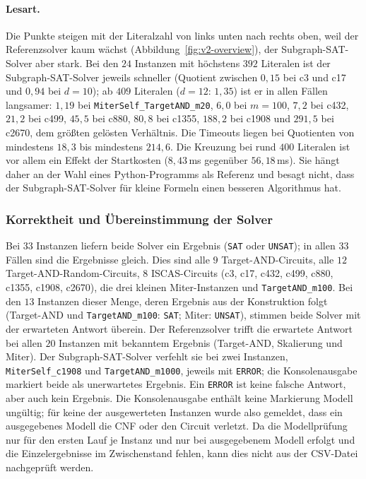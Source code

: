\documentclass[a4paper,12pt]{article}
\theoremstyle{definition}
\begin{document}
\paragraph{Lesart.} Die Punkte steigen mit der Literalzahl von links unten nach rechts oben, weil der Referenzsolver kaum wächst (Abbildung~\ref{fig:v2-overview}), der Subgraph-SAT-Solver aber stark. Bei den $24$ Instanzen mit höchstens $392$ Literalen ist der Subgraph-SAT-Solver jeweils schneller (Quotient zwischen $0{,}15$ bei c3 und c17 und $0{,}94$ bei $d=10$); ab $409$ Literalen ($d=12$: $1{,}35$) ist er in allen Fällen langsamer: $1{,}19$ bei \texttt{MiterSelf\_TargetAND\_m20}, $6{,}0$ bei $m=100$, $7{,}2$ bei c432, $21{,}2$ bei c499, $45{,}5$ bei c880, $80{,}8$ bei c1355, $188{,}2$ bei c1908 und $291{,}5$ bei c2670, dem größten gelösten Verhältnis. Die Timeouts liegen bei Quotienten von mindestens $18{,}3$ bis mindestens $214{,}6$. Die Kreuzung bei rund $400$ Literalen ist vor allem ein Effekt der Startkosten ($8{,}43$\,ms gegenüber $56{,}18$\,ms). Sie hängt daher an der Wahl eines Python-Programms als Referenz und besagt nicht, dass der Subgraph-SAT-Solver für kleine Formeln einen besseren Algorithmus hat.

\subsubsection{Korrektheit und Übereinstimmung der Solver}

Bei $33$ Instanzen liefern beide Solver ein Ergebnis (\texttt{SAT} oder \texttt{UNSAT}); in allen $33$ Fällen sind die Ergebnisse gleich. Dies sind alle $9$ Target-AND-Circuits, alle $12$ Target-AND-Random-Circuits, $8$ ISCAS-Circuits (c3, c17, c432, c499, c880, c1355, c1908, c2670), die drei kleinen Miter-Instanzen und \texttt{TargetAND\_m100}. Bei den $13$ Instanzen dieser Menge, deren Ergebnis aus der Konstruktion folgt (Target-AND und \texttt{TargetAND\_m100}: \texttt{SAT}; Miter: \texttt{UNSAT}), stimmen beide Solver mit der erwarteten Antwort überein. Der Referenzsolver trifft die erwartete Antwort bei allen $20$ Instanzen mit bekanntem Ergebnis (Target-AND, Skalierung und Miter). Der Subgraph-SAT-Solver verfehlt sie bei zwei Instanzen, \texttt{MiterSelf\_c1908} und \texttt{TargetAND\_m1000}, jeweils mit \texttt{ERROR}; die Konsolenausgabe markiert beide als \glqq unerwartetes Ergebnis\grqq. Ein \texttt{ERROR} ist keine falsche Antwort, aber auch kein Ergebnis. Die Konsolenausgabe enthält keine Markierung \glqq Modell ungültig\grqq; für keine der ausgewerteten Instanzen wurde also gemeldet, dass ein ausgegebenes Modell die CNF oder den Circuit verletzt. Da die Modellprüfung nur für den ersten Lauf je Instanz und nur bei ausgegebenem Modell erfolgt und die Einzelergebnisse im Zwischenstand fehlen, kann dies nicht aus der CSV-Datei nachgeprüft werden.
\end{document}
